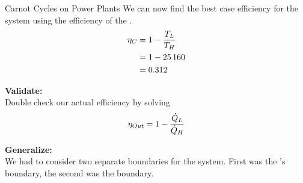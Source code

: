 \begin{example}{Carnot Cycles on Power Plants}
  We can now find the best case efficiency for the system using the efficiency of the .
  \begin{align*}
    \eta_{C} &= 1 - \frac{T_{L}}{T_{H}} \\
                    &= 1 - \SI{25}{160} \\
                    &= 0.312
  \end{align*}

  \textbf{Validate:} \\
  Double check our actual efficiency by solving
  \begin{equation*}
    \eta_{Out} = 1 - \frac{\dot{Q}_{L}}{\dot{Q}_{H}}
  \end{equation*}

  \textbf{Generalize:} \\
  We had to consider two separate boundaries for the system.
  First was the 's boundary, the second was the  boundary.
\end{example}

